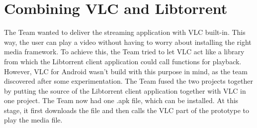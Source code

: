 \section{Combining VLC and Libtorrent}
\thispagestyle{fancy}
\label{sec:one_apk}
The Team wanted to deliver the streaming application with VLC built-in. This way, the user can play a video without having to worry about installing the right media framework. To achieve this, the Team tried to let VLC act like a library from which the Libtorrent client application could call functions for playback. However, VLC for Android wasn't build with this purpose in mind, as the team discovered after some experimentation. The Team fused the two projects together by putting the source of the Libtorrent client application together with VLC in one project. The Team now had one .apk file, which can be installed. At this stage, it first downloads the file and then calls the VLC part of the prototype to play the media file.